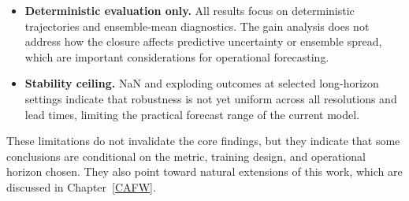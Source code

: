 \begin{itemize}
    \item \textbf{Deterministic evaluation only.} All results focus on deterministic trajectories and ensemble-mean diagnostics. The gain analysis does not address how the closure affects predictive uncertainty or ensemble spread, which are important considerations for operational forecasting.
    
    \item \textbf{Stability ceiling.} NaN and exploding outcomes at selected long-horizon settings indicate that robustness is not yet uniform across all resolutions and lead times, limiting the practical forecast range of the current model.
\end{itemize}

These limitations do not invalidate the core findings, but they indicate that some conclusions are conditional on the metric, training design, and operational horizon chosen. They also point toward natural extensions of this work, which are discussed in Chapter~\ref{CAFW}.

